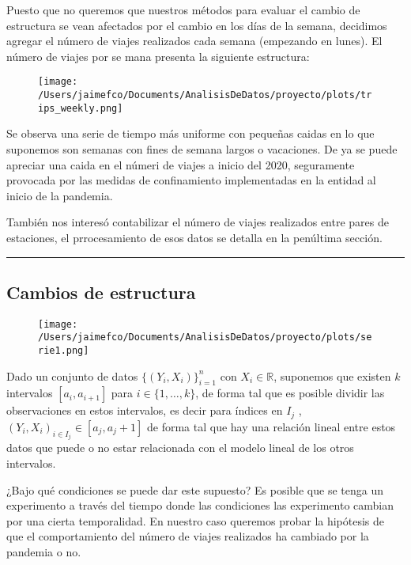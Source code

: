 \documentclass[
]{article}
\begin{document}
Puesto que no queremos que nuestros métodos para evaluar el cambio de
estructura se vean afectados por el cambio en los días de la semana,
decidimos agregar el número de viajes realizados cada semana (empezando
en lunes). El número de viajes por se mana presenta la siguiente
estructura:

\begin{figure}
\centering
\texttt{[image: /Users/jaimefco/Documents/AnalisisDeDatos/proyecto/plots/trips\_weekly.png]}
\caption{}
\end{figure}

Se observa una serie de tiempo más uniforme con pequeñas caidas en lo
que suponemos son semanas con fines de semana largos o vacaciones. De ya
se puede apreciar una caida en el númeri de viajes a inicio del 2020,
seguramente provocada por las medidas de confinamiento implementadas en
la entidad al inicio de la pandemia.

También nos interesó contabilizar el número de viajes realizados entre
pares de estaciones, el prrocesamiento de esos datos se detalla en la
penúltima sección.

\begin{center}\rule{0.5\linewidth}{0.5pt}\end{center}

\hypertarget{cambios-de-estructura}{%
\subsection{Cambios de estructura}\label{cambios-de-estructura}}

\begin{figure}
\centering
\texttt{[image: /Users/jaimefco/Documents/AnalisisDeDatos/proyecto/plots/serie1.png]}
\caption{}
\end{figure}

Dado un conjunto de datos \(\{(Y_i, X_i)\}_{i=1}^n\) con \(X_i \in \mathbb{R}\),
suponemos que existen \(k\) intervalos \([a_i, a_{i+1}]\) para
\(i \in \{1, \dots, k\}\), de forma tal que es posible dividir las
observaciones en estos intervalos, es decir para índices en \(I_j\) ,
\((Y_i, X_i)_{i \in I_j} \in [a_j, a_j+1]\) de forma tal que hay una
relación lineal entre estos datos que puede o no estar relacionada con
el modelo lineal de los otros intervalos.

¿Bajo qué condiciones se puede dar este supuesto? Es posible que se
tenga un experimento a través del tiempo donde las condiciones las
experimento cambian por una cierta temporalidad. En nuestro caso
queremos probar la hipótesis de que el comportamiento del número de
viajes realizados ha cambiado por la pandemia o no.
\end{document}
